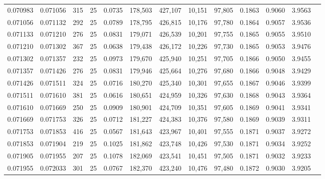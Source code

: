 \begin{tabular}{rrrrrrrrrrrrr}
0.070983 & 0.071056 &   315 &  25 &                                     0.0735 & 178,503 & 427,107 &  10,151 &  97,805 & 0.1863 & 0.9060 & 3.9563 \\
0.071056 & 0.071132 &   292 &  25 &                                     0.0789 & 178,795 & 426,815 &  10,176 &  97,780 & 0.1864 & 0.9057 & 3.9536 \\
0.071133 & 0.071210 &   276 &  25 &                                     0.0831 & 179,071 & 426,539 &  10,201 &  97,755 & 0.1865 & 0.9055 & 3.9510 \\
0.071210 & 0.071302 &   367 &  25 &                                     0.0638 & 179,438 & 426,172 &  10,226 &  97,730 & 0.1865 & 0.9053 & 3.9476 \\
0.071302 & 0.071357 &   232 &  25 &                                     0.0973 & 179,670 & 425,940 &  10,251 &  97,705 & 0.1866 & 0.9050 & 3.9455 \\
0.071357 & 0.071426 &   276 &  25 &                                     0.0831 & 179,946 & 425,664 &  10,276 &  97,680 & 0.1866 & 0.9048 & 3.9429 \\
0.071426 & 0.071511 &   324 &  25 &                                     0.0716 & 180,270 & 425,340 &  10,301 &  97,655 & 0.1867 & 0.9046 & 3.9399 \\
0.071511 & 0.071610 &   381 &  25 &                                     0.0616 & 180,651 & 424,959 &  10,326 &  97,630 & 0.1868 & 0.9043 & 3.9364 \\
0.071610 & 0.071669 &   250 &  25 &                                     0.0909 & 180,901 & 424,709 &  10,351 &  97,605 & 0.1869 & 0.9041 & 3.9341 \\
0.071669 & 0.071753 &   326 &  25 &                                     0.0712 & 181,227 & 424,383 &  10,376 &  97,580 & 0.1869 & 0.9039 & 3.9311 \\
0.071753 & 0.071853 &   416 &  25 &                                     0.0567 & 181,643 & 423,967 &  10,401 &  97,555 & 0.1871 & 0.9037 & 3.9272 \\
0.071853 & 0.071904 &   219 &  25 &                                     0.1025 & 181,862 & 423,748 &  10,426 &  97,530 & 0.1871 & 0.9034 & 3.9252 \\
0.071905 & 0.071955 &   207 &  25 &                                     0.1078 & 182,069 & 423,541 &  10,451 &  97,505 & 0.1871 & 0.9032 & 3.9233 \\
0.071955 & 0.072033 &   301 &  25 &                                     0.0767 & 182,370 & 423,240 &  10,476 &  97,480 & 0.1872 & 0.9030 & 3.9205 \\

\end{tabular}

